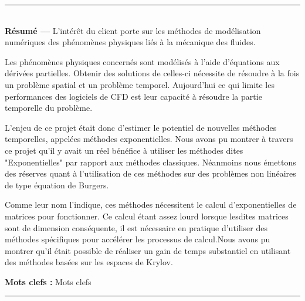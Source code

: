 \vspace*{\fill}
\noindent\rule[2pt]{\textwidth}{0.5pt}\\
{\textbf{Résumé ---}}
L'intérêt du client porte sur les méthodes de modélisation numériques des phénomènes physiques liés à la mécanique des fluides. 

Les phénomènes physiques concernés sont modélisés à l'aide d'équations aux dérivées partielles. Obtenir des solutions de celles-ci nécessite de résoudre à la fois un problème spatial et un problème temporel. Aujourd'hui ce qui limite les performances des logiciels de CFD est leur capacité à résoudre la partie temporelle du problème. 

L'enjeu de ce projet était donc d'estimer le potentiel de nouvelles méthodes temporelles, appelées méthodes exponentielles. Nous avons pu montrer à travers ce projet qu'il y avait un réel bénéfice à utiliser les méthodes dites "Exponentielles" par rapport aux méthodes classiques. 
Néanmoins nous émettons des réserves quant à l'utilisation de ces méthodes sur des problèmes non linéaires de type équation de Burgers. %

Comme leur nom l'indique, ces méthodes nécessitent le calcul d'exponentielles de matrices pour fonctionner. Ce calcul étant assez lourd lorsque lesdites matrices sont de dimension conséquente, il est nécessaire en pratique d'utiliser des méthodes spécifiques pour accélérer les processus de calcul.Nous avons pu montrer qu'il était possible de réaliser un gain de temps substantiel en utilisant des méthodes basées sur les espaces de Krylov.%

{\textbf{Mots clefs :}}
Mots clefs
\\
\noindent\rule[2pt]{\textwidth}{0.5pt}